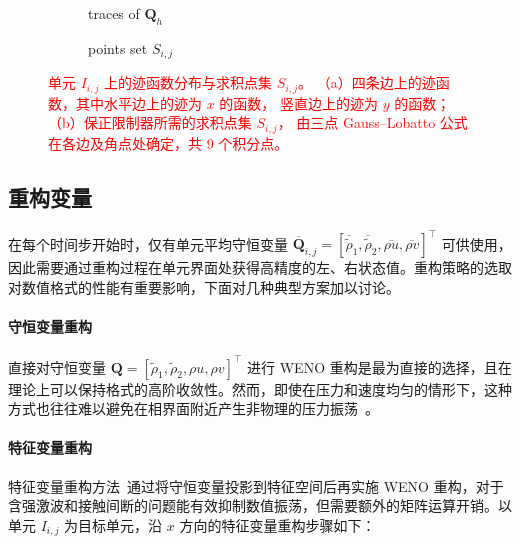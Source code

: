 \documentclass[12pt,a4paper]{article}
\numberwithin{equation}{section}    %
\begin{document}
\begin{figure}[!htbp]
    \centering
    \begin{subfigure}[b]{0.45\linewidth}
        \centering
        
        \caption{traces of $\bm{Q}_h$}
        \label{fig:cell-traces}
    \end{subfigure}
    \hfill
    \begin{subfigure}[b]{0.45\linewidth}
        \centering
        
        \caption{points set $S_{i,j}$}
        \label{fig:cell-points}
    \end{subfigure}
    \caption{\textcolor{red}{单元 $I_{i,j}$ 上的迹函数分布与求积点集 $S_{i,j}$。
             （a）四条边上的迹函数，其中水平边上的迹为 $x$ 的函数，
             竖直边上的迹为 $y$ 的函数；
             （b）保正限制器所需的求积点集 $S_{i,j}$，
             由三点 Gauss--Lobatto 公式在各边及角点处确定，共 $9$ 个积分点。}}
    \label{fig:cell-traces-points}
    \end{figure}

\subsection{重构变量}
\label{subsec:reconstructed}

在每个时间步开始时，仅有单元平均守恒变量
$\overline{\bm{Q}}_{i,j} = [\overline{\tilde{\rho}}_1,\overline{\tilde{\rho}}_2, \overline{\rho u}, \overline{\rho v}]^\top$ 可供使用，因此需要通过重构过程在单元界面处获得高精度的左、右状态值。重构策略的选取对数值格式的性能有重要影响，下面对几种典型方案加以讨论。

\paragraph{守恒变量重构}
直接对守恒变量 $\bm{Q} = [\tilde{\rho}_1, \tilde{\rho}_2,\rho u, \rho v]^\top$ 进行 WENO 重构是最为直接的选择，且在理论上可以保持格式的高阶收敛性。然而，即使在压力和速度均匀的情形下，这种方式也往往难以避免在相界面附近产生非物理的压力振荡~\cite{li2020finite,coralic2014finite}。
\paragraph{特征变量重构}

特征变量重构方法~\cite{Shu1998}通过将守恒变量投影到特征空间后再实施 WENO 重构，对于含强激波和接触间断的问题能有效抑制数值振荡，但需要额外的矩阵运算开销。以单元 $I_{i,j}$ 为目标单元，沿 $x$ 方向的特征变量重构步骤如下：
\end{document}
